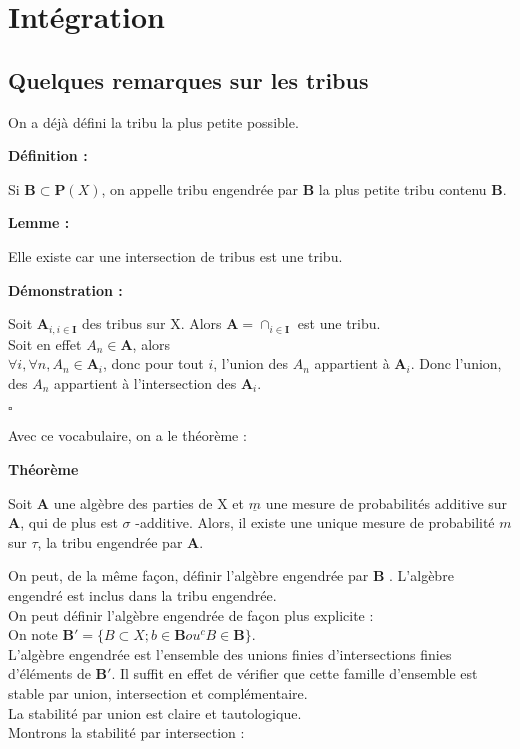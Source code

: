 \documentclass[10pt,a4paper,notitlepage ]{report}
\newenvironment{definition}{
	
	\textbf{Définition : }
}
{}
\newcounter{th}
\newenvironment{theorem}[1][]{
\refstepcounter{th}
\begin{tcolorbox}
	\textbf{Théorème \theth \ #1}
	
	
}{\end{tcolorbox}}
\newenvironment{demo}[1][]{

	\textbf{Démonstration #1 :}
}{\begin{flushright}
	$\square$
\end{flushright}
}
\newenvironment{lemme}[1][]{
	\begin{tcolorbox}
		\textbf{Lemme #1 : }
	}
	{\end{tcolorbox}}
\begin{document}
\chapter{Intégration}

\section{Quelques remarques sur les tribus}

On a déjà défini la tribu la plus petite possible. 

\begin{definition}
Si $\mathbf{B} \subset \mathbf{P} (X)$, on appelle tribu engendrée par $\mathbf{B}$ la plus petite tribu contenu $\mathbf{B}$.
\end{definition}

\begin{lemme}
Elle existe car une intersection de tribus est une tribu.
\end{lemme}

\begin{demo}
Soit $\mathbf{A}_{i, i \in \mathbf{I}}$ des tribus sur X. Alors $\mathbf{A} = \cap _ {i \in \mathbf{I}}$ est une tribu. \\
Soit en effet $A_n \in \mathbf{A}$, alors \\
$\forall i, \forall n, A_n \in \mathbf{A}_i $, donc pour tout $i$, l'union des $A_n$ appartient à $\mathbf{A} _i$. Donc l'union, des $A_n$ appartient à l'intersection des $\mathbf{A} _i$.
\end{demo}

Avec ce vocabulaire, on a le théorème :

\begin{theorem}
Soit $\mathbf{A}$ une algèbre des parties de X et $\underline{m}$ une mesure de probabilités additive sur $\mathbf{A}$, qui de plus est $\sigma$ -additive. Alors, il existe une unique mesure de probabilité $m$ sur $\tau$, la tribu engendrée par $\mathbf{A}$.
\end{theorem}

On peut, de la même façon, définir l'algèbre engendrée par $\mathbf{B}$ . L'algèbre engendré est inclus dans la tribu engendrée. \\
On peut définir l'algèbre engendrée de façon plus explicite : \\
On note $\mathbf{B}' = \lbrace B \subset X ; b \in \mathbf{B} ou ^c B \in \mathbf{B} \rbrace $. \\
L'algèbre engendrée est l'ensemble des unions finies d'intersections finies d'éléments de $\mathbf{B}'$. Il suffit en effet de vérifier que cette famille d'ensemble est stable par union, intersection et complémentaire. \\
La stabilité par union est claire et tautologique. \\
Montrons la stabilité par intersection : 
\end{document}
